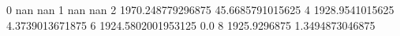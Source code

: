 0 nan nan
1 nan nan
2 1970.248779296875 45.6685791015625
4 1928.9541015625 4.3739013671875
6 1924.5802001953125 0.0
8 1925.9296875 1.3494873046875
